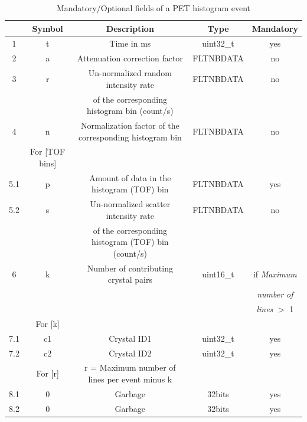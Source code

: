 \documentclass[a4paper, 11pt]{article}
\begin{document}
\begin{table} [h!]
  \small
  \caption{Mandatory/Optional fields of a PET histogram event}
  \label{table_PET_data_bin_histogram}
  \begin{center}
  \begin{tabular}{|c|c|c|c|c|}
  \hline
    & \textbf{Symbol} & \textbf{Description} & \textbf{Type} & \textbf{Mandatory}\\
  \hline
  \hline
  1 & t & Time in ms & uint32\_t & yes \\ \hline
  2 & a & Attenuation correction factor & FLTNBDATA & no \\ \hline
  3 & r & Un-normalized random intensity rate & FLTNBDATA & no \\ 
    &  & of the corresponding histogram bin (count/s) & &  \\ \hline
  4 & n & Normalization factor of the corresponding histogram bin & FLTNBDATA & no \\  \hline
  \cellcolor{blue!25}&\cellcolor{blue!25} For [TOF bins] &\cellcolor{blue!25} & \cellcolor{blue!25}& \cellcolor{blue!25} \\ \hline
  5.1 & p & Amount of data in the histogram (TOF) bin & FLTNBDATA & yes \\ \hline
  5.2 & s & Un-normalized scatter intensity rate & FLTNBDATA & no \\
      & & of the corresponding histogram (TOF) bin (count/s) & & \\ \hline
  6 & k & Number of contributing crystal pairs & uint16\_t & if \textit{Maximum} \\
    & & & &                                                     \textit{number of} \\
    & & & &                                                     \textit{lines} $>$ 1 \\ \hline
  \cellcolor{blue!25}& \cellcolor{blue!25}For [k]&\cellcolor{blue!25}&\cellcolor{blue!25}&\cellcolor{blue!25} \\ \hline
  7.1 & c1 & Crystal ID1 & uint32\_t & yes \\ \hline
  7.2 & c2 & Crystal ID2 & uint32\_t & yes \\ \hline
  \cellcolor{blue!25}& \cellcolor{blue!25}For [r]& \cellcolor{blue!25}r = Maximum number of lines per event minus k & \cellcolor{blue!25}&\cellcolor{blue!25}  \\ \hline
  8.1 & 0 & Garbage & 32bits & yes \\ \hline
  8.2 & 0 & Garbage & 32bits & yes \\ \hline
  \end{tabular}
  \end{center}
\end{table}
\end{document}
